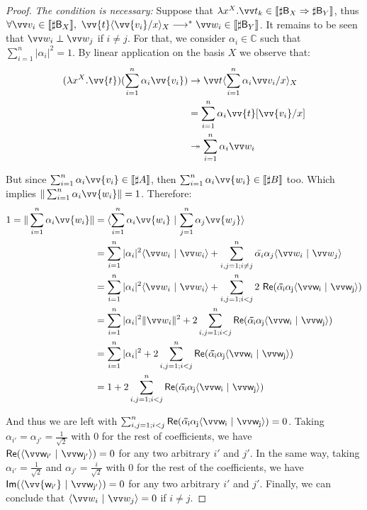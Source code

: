 \documentclass[runningheads,orivec,envcountsame,envcountsect]{llncs}
\newcommand\Rpart[1]{\mathsf{Re(#1)}}
\newcommand\Ipart[1]{\mathsf{Im(#1)}}
\newcommand\lra{\longrightarrow}
\newcommand\ansubst[2]{\ensuremath{\langle #1 \rangle_{#2}}}
\def\C{\mathbb{C}}            %
\def\scal#1#2{\langle{#1}~|~{#2}\rangle}
\def\Lam#1#2#3{\lambda#1^{#2}{.}#3} %
\def\eval{\lra^*}
\def\Arr{\Rightarrow}
\def\sem#1{\llbracket#1\rrbracket}
\newcommand\basis[1]{\ensuremath{\mathsf{B}_{#1}}}
\begin{document}
\begin{proof}
  \textit{The condition is necessary:} Suppose that $\Lam{x}{X}{\vv t_k}\in\sem{\sharp\basis{X}\Arr\sharp\basis{Y}}$, thus $\forall \vv v_i\in\sem{\sharp\basis{X}},\ \vv{t}\ansubst{\vv{v_i}/x}{X}\eval\vv w_i\in\sem{\sharp\basis{Y}}$. It remains to be seen that $\vv w_i \perp \vv w_j$ if $i\neq j$. For that, we consider $\alpha_i\in\C$ such that $\sum_{i=1}^n |\alpha_i|^2 = 1$. By linear application on the basis $X$ we observe that:
  \begin{align*}
    (\Lam{x}{X}{\vv{t}})(\sum_{i=1}^n \alpha_i \vv{v_i}) &\to \vv t\ansubst{\sum_{i=1}^n \alpha_i \vv v_i/x}{X}\\
    &= \sum_{i=1}^{n} \alpha_i \vv{t}[\vv{v_i}/x]\\ 
    &\twoheadrightarrow \sum_{i=1}^n \alpha_i \vv w_i
  \end{align*}

  But since $\sum_{i=1}^n \alpha_i \vv{v_i}\in\sem{\sharp A}$, then $\sum_{i=1}^n \alpha_i \vv{w_i}\in\sem{\sharp B}$ too. Which implies $\|\sum_{i=1}^n \alpha_i \vv{w_i}\|=1$. Therefore:
  \begin{align*}
    1 = \|\sum_{i=1}^n \alpha_i \vv{w_i}\| &= \scal{\sum_{i=1}^n \alpha_i \vv{w_i}}{\sum_{j=1}^n \alpha_j \vv{w_j}}\\
    &=\sum_{i=1}^n |\alpha_i|^2 \scal{\vv w_i}{\vv w_i } + \sum_{i,j=1; i\neq j}^n \bar{\alpha_i}\alpha_j \scal{\vv w_i}{\vv w_j}\\
    &=\sum_{i=1}^n |\alpha_i|^2 \scal{\vv w_i}{\vv w_i } + \sum_{i,j=1; i<j}^n 2~\Rpart{\bar{\alpha_i}\alpha_j \scal{\vv w_i}{\vv w_j}}\\
    &=\sum_{i=1}^n |\alpha_i|^2 \|\vv w_i\|^2 + 2\sum_{i,j=1; i<j}^n \Rpart{\bar{\alpha_i}\alpha_j \scal{\vv w_i}{\vv w_j}}\\
    &=\sum_{i=1}^n |\alpha_i|^2 + 2\sum_{i,j=1; i<j}^n\Rpart{\bar{\alpha_i}\alpha_j \scal{\vv w_i}{\vv w_j}}\\
    &= 1 + 2\sum_{i,j=1; i<j}^n \Rpart{\bar{\alpha_i}\alpha_j \scal{\vv w_i}{\vv w_j}}
  \end{align*}

  And thus we are left with $\sum_{i,j=1; i<j}^n \Rpart{\bar{\alpha_i}\alpha_j \scal{\vv w_i}{\vv w_j}} = 0$. Taking $\alpha_{i'} = \alpha_{j'} = \frac{1}{\sqrt{2}}$ with $0$ for the rest of coefficients, we have $\Rpart{\scal{\vv w_{i'}}{\vv w_{j'}}} = 0$ for any two arbitrary $i'$ and $j'$. In the same way, taking $\alpha_{i'} = \frac{1}{\sqrt{2}}$ and $\alpha_{j'}=\frac{i}{\sqrt{2}}$ with $0$ for the rest of the coefficients, we have $\Ipart{\scal{\vv{w_{i'}}}{\vv w_{j'}}} = 0$ for any two arbitrary $i'$ and $j'$. Finally, we can conclude that $\scal{\vv w_i}{\vv w_j}=0$ if $i\neq j$.


\end{proof}
\end{document}
